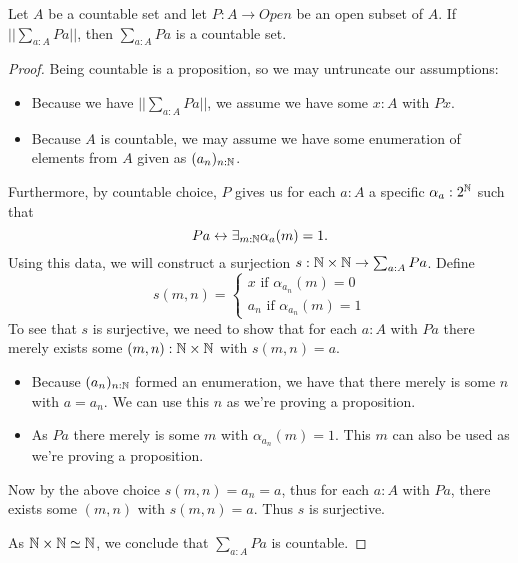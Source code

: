\begin{lemma}
  Let $A$ be a countable set and let $P:A \to Open$
  be an open subset of $A$. 
  If $||\sum_{a:A} P a||$, then $\sum_{a:A} P a$ is a countable set. 
\end{lemma}
\begin{proof}
  Being countable is a proposition, so we may untruncate our assumptions:
  \begin{itemize}
    \item 
      Because we have $||\sum_{a:A} P a||$, we assume we have  some $x:A$ with $P x$. 
    \item 
      Because $A$ is countable, we may assume we have some 
      enumeration of elements from $A$ given as $(a_n)_{n:\mathbb{N}}$.
  \end{itemize}
  Furthermore, by countable choice, $P$ gives us 
  for each $a:A$ a specific $\alpha_a:2^{\mathbb{N}}$ 
  such that 
  \begin{equation}
    P a \leftrightarrow \exists_{m:\mathbb{N}} \alpha_a(m) = 1.
  \end{equation}
  Using this data, we will 
  construct a surjection $s:\mathbb{N} \times \mathbb{N} \to \sum_{a:A} P a$. 
  Define 
  \begin{equation}
    s(m,n) = 
    \begin{cases}
      x \text{ if } \alpha_{a_n}(m) = 0 \\
      a_n \text{ if } \alpha_{a_n}(m) = 1
    \end{cases}
  \end{equation}
  To see that $s$ is surjective, we need to show that for each $a:A$ with $P a$ there 
  merely exists some $(m,n):\mathbb{N} \times \mathbb{N}$ 
  with $s(m,n) = a$. 
  \begin{itemize}
    \item 
  Because $(a_n)_{n:\mathbb{N}}$ formed an enumeration, we have that 
  there merely is some $n$ with $a = a_n$. 
  We can use this $n$ as we're proving a proposition. 
    \item 
  As $P a$ there merely is some $m$ with $\alpha_{a_n}(m) = 1$. 
  This $m$ can also be used as we're proving a proposition. 
  \end{itemize}
  Now by the above choice $s(m,n) = a_n = a$, 
  thus for each $a:A$ with $P a$, there exists some $(m,n)$ with 
  $s(m,n) = a$. Thus $s$ is surjective. 

  As $\mathbb{N} \times \mathbb{N} \simeq \mathbb{N}$, we conclude that 
  $\sum_{a:A} P a$ is countable. 
\end{proof}

